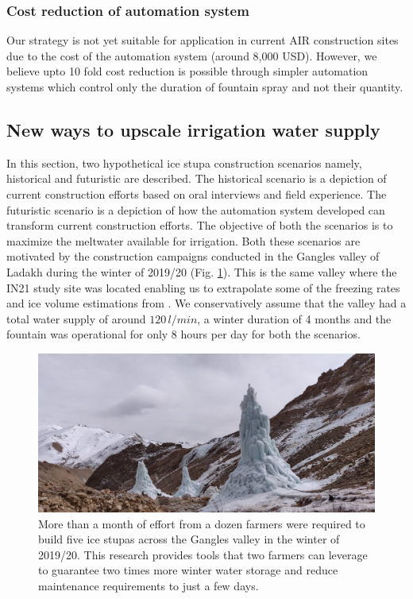 \documentclass[tc, manuscript]{copernicus}
\begin{document}
\subsubsection{Cost reduction of automation system}

Our strategy is not yet suitable for application in current AIR construction sites due to the cost of the
automation system (around 8,000 USD). However, we believe upto 10 fold cost reduction is possible through
simpler automation systems which control only the duration of fountain spray and not their quantity. 

\subsection{New ways to upscale irrigation water supply}

In this section, two hypothetical ice stupa construction scenarios namely, historical and futuristic are
described. The historical scenario is a depiction of current construction efforts based on oral interviews and
field experience. The futuristic scenario is a depiction of how the automation system developed can transform
current construction efforts. The objective of both the scenarios is to maximize the meltwater available for
irrigation. Both these scenarios are motivated by the construction campaigns conducted in the Gangles valley of
Ladakh during the winter of 2019/20 (Fig. \ref{fig:icestupa_valley}). This is the same valley where the IN21
study site was located enabling us to extrapolate some of the freezing rates and ice volume estimations from
\citet{balasubramanianInfluenceMeteorologicalConditions2022}. We conservatively assume that the valley had a
total water supply of around $120\,l/min$, a winter duration of 4 months and the fountain was operational for
only 8 hours per day for both the scenarios. 

\begin{figure}[htb]
	\includegraphics[width=\textwidth]{Figures/icestupa_valley}

  \caption{More than a month of effort from a dozen farmers were required to build five ice stupas across the
  Gangles valley in the winter of 2019/20. This research provides tools that two farmers can leverage to
  guarantee two times more winter water storage and reduce maintenance requirements to just a few days.}

	\label{fig:icestupa_valley}
\end{figure}
\end{document}
